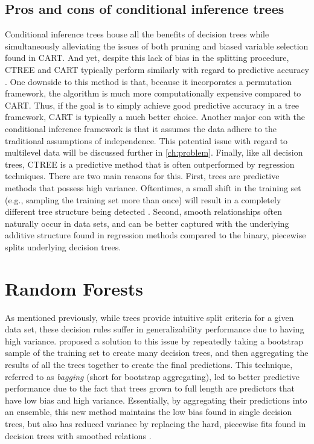 
\subsection{Pros and cons of conditional inference trees}


	Conditional inference trees house all the benefits of decision trees while simultaneously alleviating the issues of both pruning and biased variable selection found in CART. And yet, despite this lack of bias in the splitting procedure, CTREE and CART typically perform similarly with regard to predictive accuracy \cite{hothorn2006unbiased, strobl2007bias}. One downside to this method is that, because it incorporates a permutation framework, the algorithm is much more computationally expensive compared to CART. Thus, if the goal is to simply achieve good predictive accuracy in a tree framework, CART is typically a much better choice. Another major con with the conditional inference framework is that it assumes the data adhere to the traditional assumptions of independence. This potential issue with regard to multilevel data will be discussed further in \autoref{ch:problem}. Finally, like all decision trees, CTREE is a predictive method that is often outperformed by regression techniques. There are two main reasons for this. First, trees are predictive methods that possess high variance. Oftentimes, a small shift in the training set (e.g., sampling the training set more than once) will result in a completely different tree structure being detected \cite{hastie2009elements}. Second, smooth relationships often naturally occur in data sets, and can be better captured with the underlying additive structure found in regression methods compared to the binary, piecewise splits underlying decision trees.



\section{Random Forests}


	As mentioned previously, while trees provide intuitive split criteria for a given data set, these decision rules suffer in generalizability performance due to having high variance.  proposed a solution to this issue by repeatedly taking a bootstrap sample of the training set to create many decision trees, and then aggregating the results of all the trees together to create the final predictions. This technique, referred to as \textit{bagging} (short for bootstrap aggregating), led to better predictive performance due to the fact that trees grown to full length are predictors that have low bias and high variance. Essentially, by aggregating their predictions into an ensemble, this new method maintains the low bias found in single decision trees, but also has reduced variance by replacing the hard, piecewise fits found in decision trees with smoothed relations \cite{breiman1996bagging, buhlmann2002analyzing, strobl2009introduction}.

